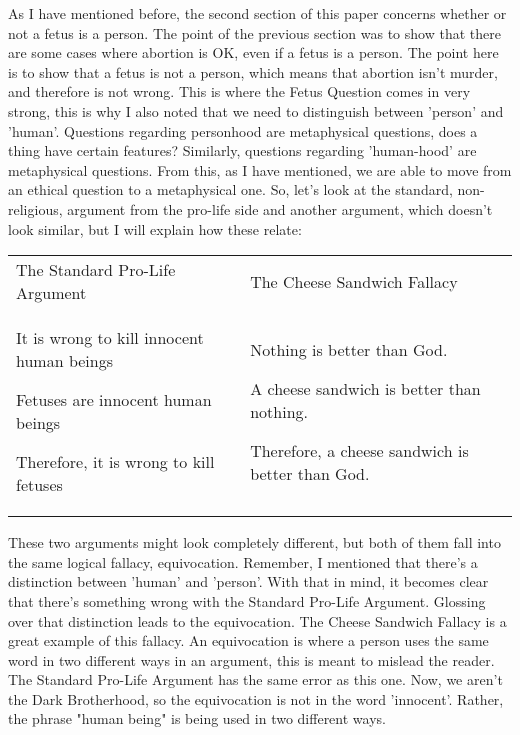 As I have mentioned before, the second section of this paper concerns whether or not a fetus is a person. The point of the previous section was to show that there are some cases where abortion is OK, even if a fetus is a person. The point here is to show that a fetus is not a person, which means that abortion isn't murder, and therefore is not wrong. This is where the Fetus Question comes in very strong, this is why I also noted that we need to distinguish between 'person' and 'human'. Questions regarding personhood are metaphysical questions, does a thing have certain features? Similarly, questions regarding 'human-hood' are metaphysical questions. From this, as I have mentioned, we are able to move from an ethical question to a metaphysical one. So, let's look at the standard, non-religious, argument from the pro-life side and another argument, which doesn't look similar, but I will explain how these relate:
\noindent
\begin{tabular}{p{2.75in}|p{2.75in}}
The Standard Pro-Life Argument&The Cheese Sandwich Fallacy\\
\begin{earg}
    \item[] It is wrong to kill innocent human beings
    \item[] Fetuses are innocent human beings
    \item[] Therefore, it is wrong to kill fetuses
\end{earg}&
\begin{earg}
    \item[] Nothing is better than God.
    \item[] A cheese sandwich is better than nothing.
    \item[] Therefore, a cheese sandwich is better than God. 
\end{earg}
\end{tabular}
These two arguments might look completely different, but both of them fall into the same logical fallacy, equivocation. Remember, I mentioned that there's a distinction between 'human' and 'person'. With that in mind, it becomes clear that there's something wrong with the Standard Pro-Life Argument. Glossing over that distinction leads to the equivocation. The Cheese Sandwich Fallacy is a great example of this fallacy. An equivocation is where a person uses the same word in two different ways in an argument, this is meant to mislead the reader.  The Standard Pro-Life Argument has the same error as this one. Now, we aren't the Dark Brotherhood, so the equivocation is not in the word 'innocent'. Rather, the phrase "human being" is being used in two different ways.

